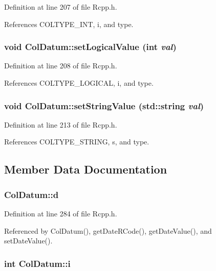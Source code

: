 Definition at line 207 of file Rcpp.h.

References COLTYPE\_\-INT, i, and type.\hypertarget{classColDatum_a19ebd9c0e3e2544c8679999ab91c9e20}{
\subsubsection[{setLogicalValue}]{\setlength{\rightskip}{0pt plus 5cm}void ColDatum::setLogicalValue (int {\em val})}}
\label{classColDatum_a19ebd9c0e3e2544c8679999ab91c9e20}


Definition at line 208 of file Rcpp.h.

References COLTYPE\_\-LOGICAL, i, and type.\hypertarget{classColDatum_aa87060ae6c415167d501c41684d8a586}{
\subsubsection[{setStringValue}]{\setlength{\rightskip}{0pt plus 5cm}void ColDatum::setStringValue (std::string {\em val})}}
\label{classColDatum_aa87060ae6c415167d501c41684d8a586}


Definition at line 213 of file Rcpp.h.

References COLTYPE\_\-STRING, s, and type.

\subsection{Member Data Documentation}
\hypertarget{classColDatum_a01a9fd53a56cf0cafa9c3230a3185c8c}{
\subsubsection[{d}]{ {\bf ColDatum::d}}}
\label{classColDatum_a01a9fd53a56cf0cafa9c3230a3185c8c}


Definition at line 284 of file Rcpp.h.

Referenced by ColDatum(), getDateRCode(), getDateValue(), and setDateValue().\hypertarget{classColDatum_a4ceff4204e29f345957cb5544f40104f}{
\subsubsection[{i}]{\setlength{\rightskip}{0pt plus 5cm}int {\bf ColDatum::i}}}
\label{classColDatum_a4ceff4204e29f345957cb5544f40104f}


